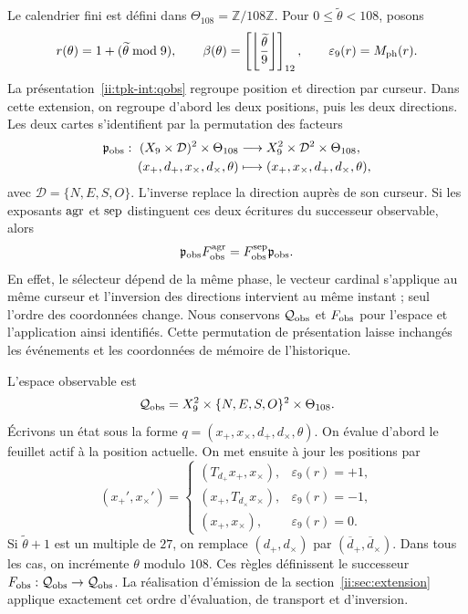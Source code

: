 Le calendrier fini est défini dans \(\Theta_{108}=\mathbb Z/108\mathbb Z\). Pour \(0\leq\widetilde\theta<108\), posons
\[
 r(\theta)=1+(\widetilde\theta\bmod9),\qquad
 \beta(\theta)=\left[\left\lfloor\frac{\widetilde\theta}{9}
 \right\rfloor\right]_{12},\qquad
 \varepsilon_9(r)=M_{\rm ph}(r).
\]
La présentation~\eqref{ii:tpk-int:qobs} regroupe position et direction par curseur. Dans cette extension, on regroupe d’abord les deux positions, puis les deux directions. Les deux cartes s’identifient par la permutation des facteurs
\begin{equation}
 \begin{aligned}
 \mathfrak p_{\rm obs}:\ (X_9\times\mathcal D)^2\times\Theta_{108}
 &\longrightarrow X_9^2\times\mathcal D^2\times\Theta_{108},\\
 (x_+,d_+,x_\times,d_\times,\theta)
 &\longmapsto(x_+,x_\times,d_+,d_\times,\theta),
 \end{aligned}
 \label{ii:ii:permutacion-coordenadas-observables}
\end{equation}
avec \(\mathcal D=\{N,E,S,O\}\). L'inverse replace la direction auprès de son curseur. Si les exposants \({\rm agr}\) et \({\rm sep}\) distinguent ces deux écritures du successeur observable, alors
\[
 \mathfrak p_{\rm obs}F_{\rm obs}^{\rm agr}
 =F_{\rm obs}^{\rm sep}\mathfrak p_{\rm obs}.
\]
En effet, le sélecteur dépend de la même phase, le vecteur cardinal s'applique au même curseur et l'inversion des directions intervient au même instant ; seul l'ordre des coordonnées change. Nous conservons \(\mathcal Q_{\rm obs}\) et \(F_{\rm obs}\) pour l'espace et l'application ainsi identifiés. Cette permutation de présentation laisse inchangés les événements et les coordonnées de mémoire de l'historique.

L'espace observable est
\[
 \mathcal Q_{\rm obs}
 =X_9^2\times\{N,E,S,O\}^2\times\Theta_{108}.
\]
Écrivons un état sous la forme \(q=(x_+,x_\times,d_+,d_\times,\theta)\). On évalue d'abord le feuillet actif à la position actuelle. On met ensuite à jour les positions par
\begin{equation}
 (x_+',x_\times')=
 \begin{cases}
 (T_{d_+}x_+,x_\times),&\varepsilon_9(r)=+1,\\
 (x_+,T_{d_\times}x_\times),&\varepsilon_9(r)=-1,\\
 (x_+,x_\times),&\varepsilon_9(r)=0.
 \end{cases}
 \label{ii:ii:tpk-fobs-posiciones}
\end{equation}
Si \(\widetilde\theta+1\) est un multiple de \(27\), on remplace \((d_+,d_\times)\) par \((\overline d_+,\overline d_\times)\). Dans tous les cas, on incrémente \(\theta\) modulo \(108\). Ces règles définissent le successeur \(F_{\rm obs}:\mathcal Q_{\rm obs}\to\mathcal Q_{\rm obs}\). La réalisation d'émission de la section~\ref{ii:sec:extension} applique exactement cet ordre d'évaluation, de transport et d'inversion.

